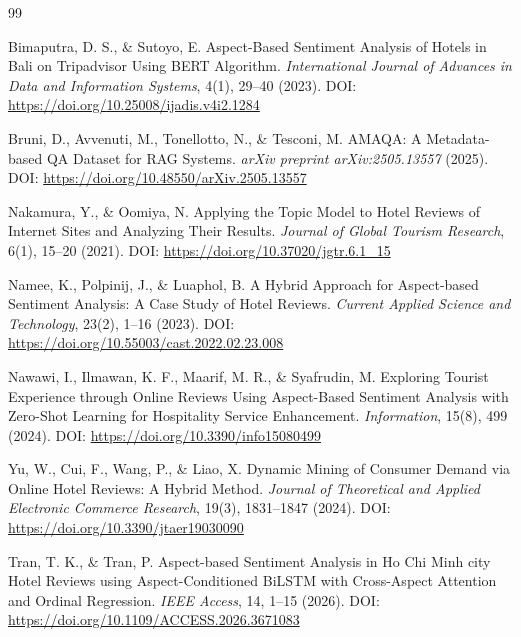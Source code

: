 \documentclass[pdflatex,sn-mathphys-num]{sn-jnl}
\theoremstyle{thmstyleone}
\theoremstyle{thmstyletwo}
\theoremstyle{thmstylethree}
\begin{document}


\begin{thebibliography}{99}
    
    Bimaputra, D. S., \& Sutoyo, E.
    Aspect-Based Sentiment Analysis of Hotels in Bali on Tripadvisor Using BERT Algorithm.
    \textit{International Journal of Advances in Data and Information Systems}, 4(1), 29--40 (2023).
    DOI: \url{https://doi.org/10.25008/ijadis.v4i2.1284}
    
    Bruni, D., Avvenuti, M., Tonellotto, N., \& Tesconi, M.
    AMAQA: A Metadata-based QA Dataset for RAG Systems.
    \textit{arXiv preprint arXiv:2505.13557} (2025).
    DOI: \url{https://doi.org/10.48550/arXiv.2505.13557}
    
    Nakamura, Y., \& Oomiya, N.
    Applying the Topic Model to Hotel Reviews of Internet Sites and Analyzing Their Results.
    \textit{Journal of Global Tourism Research}, 6(1), 15--20 (2021).
    DOI: \url{https://doi.org/10.37020/jgtr.6.1_15}
    
    Namee, K., Polpinij, J., \& Luaphol, B.
    A Hybrid Approach for Aspect-based Sentiment Analysis: A Case Study of Hotel Reviews.
    \textit{Current Applied Science and Technology}, 23(2), 1--16 (2023).
    DOI: \url{https://doi.org/10.55003/cast.2022.02.23.008}
    
    Nawawi, I., Ilmawan, K. F., Maarif, M. R., \& Syafrudin, M.
    Exploring Tourist Experience through Online Reviews Using Aspect-Based Sentiment Analysis with Zero-Shot Learning for Hospitality Service Enhancement.
    \textit{Information}, 15(8), 499 (2024).
    DOI: \url{https://doi.org/10.3390/info15080499}
    
    Yu, W., Cui, F., Wang, P., \& Liao, X.
    Dynamic Mining of Consumer Demand via Online Hotel Reviews: A Hybrid Method.
    \textit{Journal of Theoretical and Applied Electronic Commerce Research}, 19(3), 1831--1847 (2024).
    DOI: \url{https://doi.org/10.3390/jtaer19030090}
    
    Tran, T. K., \& Tran, P.
    Aspect-based Sentiment Analysis in Ho Chi Minh city Hotel Reviews using Aspect-Conditioned BiLSTM with Cross-Aspect Attention and Ordinal Regression.
    \textit{IEEE Access}, 14, 1--15 (2026).
    DOI: \url{https://doi.org/10.1109/ACCESS.2026.3671083}
    
\end{thebibliography}
\end{document}

